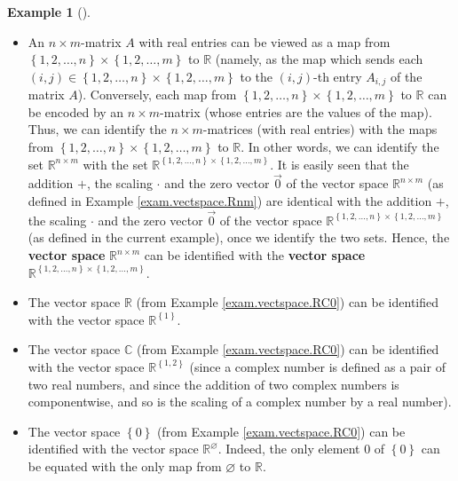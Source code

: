 \documentclass[numbers=enddot,12pt,final,onecolumn,notitlepage]{scrartcl}%
\theoremstyle{definition}
\newtheorem{exam}[theo]{Example}
\newenvironment{example}[1][]
{\begin{exam}[#1]\begin{leftbar}}
{\end{leftbar}\end{exam}}
\begin{document}
\begin{example}
\begin{itemize}
\item An $n\times m$-matrix $A$ with real entries can be viewed as a map from
$\left\{  1,2,\ldots,n\right\}  \times\left\{  1,2,\ldots,m\right\}  $ to
$\mathbb{R}$ (namely, as the map which sends each $\left(  i,j\right)
\in\left\{  1,2,\ldots,n\right\}  \times\left\{  1,2,\ldots,m\right\}  $ to
the $\left(  i,j\right)  $-th entry $A_{i,j}$ of the matrix $A$). Conversely,
each map from $\left\{  1,2,\ldots,n\right\}  \times\left\{  1,2,\ldots
,m\right\}  $ to $\mathbb{R}$ can be encoded by an $n\times m$-matrix (whose
entries are the values of the map). Thus, we can identify the $n\times
m$-matrices (with real entries) with the maps from $\left\{  1,2,\ldots
,n\right\}  \times\left\{  1,2,\ldots,m\right\}  $ to $\mathbb{R}$. In other
words, we can identify the set $\mathbb{R}^{n\times m}$ with the set
$\mathbb{R}^{\left\{  1,2,\ldots,n\right\}  \times\left\{  1,2,\ldots
,m\right\}  }$. It is easily seen that the addition $+$, the scaling $\cdot$
and the zero vector $\overrightarrow{0}$ of the vector space $\mathbb{R}%
^{n\times m}$ (as defined in Example \ref{exam.vectspace.Rnm}) are identical
with the addition $+$, the scaling $\cdot$ and the zero vector
$\overrightarrow{0}$ of the vector space $\mathbb{R}^{\left\{  1,2,\ldots
,n\right\}  \times\left\{  1,2,\ldots,m\right\}  }$ (as defined in the current
example), once we identify the two sets. Hence, the \textbf{vector space}
$\mathbb{R}^{n\times m}$ can be identified with the \textbf{vector space}
$\mathbb{R}^{\left\{  1,2,\ldots,n\right\}  \times\left\{  1,2,\ldots
,m\right\}  }$.

\item The vector space $\mathbb{R}$ (from Example \ref{exam.vectspace.RC0})
can be identified with the vector space $\mathbb{R}^{\left\{  1\right\}  }$.

\item The vector space $\mathbb{C}$ (from Example \ref{exam.vectspace.RC0})
can be identified with the vector space $\mathbb{R}^{\left\{  1,2\right\}  }$
(since a complex number is defined as a pair of two real numbers, and since
the addition of two complex numbers is componentwise, and so is the scaling of
a complex number by a real number).

\item The vector space $\left\{  0\right\}  $ (from Example
\ref{exam.vectspace.RC0}) can be identified with the vector space
$\mathbb{R}^{\varnothing}$. Indeed, the only element $0$ of $\left\{
0\right\}  $ can be equated with the only map from $\varnothing$ to
$\mathbb{R}$.


\end{itemize}
\end{example}
\end{document}
